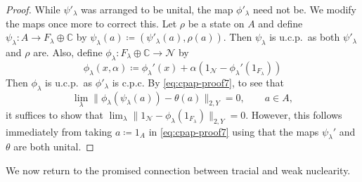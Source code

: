 \documentclass[a4paper,11pt]{amsart}
\theoremstyle{definition}
\numberwithin{equation}{section}
\numberwithin{theorem}{section}
\begin{document}
\begin{proof}
	While $\psi'_\lambda$ was arranged to be unital, the map $\phi'_\lambda$ need not be.  We modify the maps once more to correct this.  Let $\rho$ be a state on $A$ and define $\psi_\lambda \colon A \rightarrow F_\lambda \oplus \mathbb C$ by $\psi_\lambda(a) \coloneqq (\psi'_\lambda(a), \rho(a))$.  Then $\psi_\lambda$ is u.c.p.\ as both $\psi'_\lambda$ and $\rho$ are.  Also, define $\phi_\lambda \colon F_\lambda \oplus \mathbb C \rightarrow \mathcal N$ by
	\begin{equation}
		\phi_\lambda(x, \alpha) \coloneqq \phi_\lambda'(x) + \alpha(1_\mathcal N - \phi_\lambda'(1_{F_\lambda}))
	\end{equation}
	Then $\phi_\lambda$ is u.c.p.\ as $\phi'_\lambda$ is c.p.c.  By \eqref{eq:cpap-proof7}, to see that 
	\begin{equation}
		\lim_\lambda \|\phi_\lambda(\psi_\lambda(a)) - \theta(a) \|_{2, Y} = 0, \qquad a \in A,
	\end{equation} 
	it suffices to show that $\lim_\lambda \|1_\mathcal N -  \phi_\lambda(1_{F_\lambda}) \|_{2, Y} = 0$.  However, this follows immediately from taking $a \coloneqq 1_A$ in \eqref{eq:cpap-proof7} using that the maps $\psi_\lambda'$ and $\theta$ are both unital.
\end{proof}

We now return to the promised connection between tracial and weak nuclearity.
\end{document}
